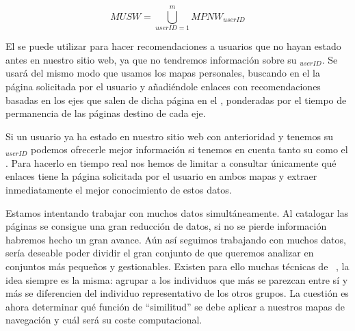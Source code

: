 \begin{Definition}\label{def:1-3-1-MUSW}
  \begin{equation}\label{eq:1-3-1-MUSW}
    MUSW = \bigcup_{userID=1}^{m}{MPNW_{userID}} 
  \end{equation}
\end{Definition}

El \MUSW se puede utilizar para hacer recomendaciones a usuarios que no hayan estado antes en nuestro sitio web, ya que no tendremos información sobre su \MPNW$_{userID}$. Se usará del mismo modo que usamos los mapas personales, buscando en el \grafo la página solicitada por el usuario y añadiéndole enlaces con recomendaciones basadas en los ejes que salen de dicha página en el \grafo, ponderadas por el tiempo de permanencia de las páginas destino de cada eje.

Si un usuario ya ha estado en nuestro sitio web con anterioridad y tenemos su \MPNW$_{userID}$ podemos ofrecerle mejor información si tenemos en cuenta tanto su \MPNW como el \MUSW. Para hacerlo en tiempo real nos hemos de limitar a consultar únicamente qué enlaces tiene la página solicitada por el usuario en ambos mapas y extraer inmediatamente el mejor conocimiento de estos datos. 

Estamos intentando trabajar con muchos datos simultáneamente. Al catalogar las páginas se consigue una gran reducción de datos, si no se pierde información habremos hecho un gran avance. Aún así seguimos trabajando con muchos datos, sería deseable poder dividir el gran conjunto de \grafos que queremos analizar en conjuntos más pequeños y gestionables. Existen para ello muchas técnicas de \clustering~\citep{NgHan-EfficientAndEffectiveClusteringMethods-1994}, la idea siempre es la misma: agrupar a los individuos que más se parezcan entre sí y más se diferencien del individuo representativo de los otros grupos. La cuestión es ahora determinar qué función de "`similitud"' se debe aplicar a nuestros mapas de navegación y cuál será su coste computacional.

